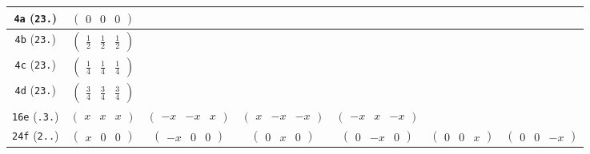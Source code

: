 \documentclass[fleqn,9pt,landscape]{jsarticle}
\begin{document}
\begin{center}
\begin{longtable}{ccccccc}
{\tt 4a} ({\tt 23.}) & $ \begin{pmatrix} 0 & 0 & 0 \end{pmatrix} $ & $  $ & $  $ & $  $ & $  $ & $  $ \\ \hline
{\tt 4b} ({\tt 23.}) & $ \begin{pmatrix} \frac{1}{2} & \frac{1}{2} & \frac{1}{2} \end{pmatrix} $ & $  $ & $  $ & $  $ & $  $ & $  $ \\ \hline
{\tt 4c} ({\tt 23.}) & $ \begin{pmatrix} \frac{1}{4} & \frac{1}{4} & \frac{1}{4} \end{pmatrix} $ & $  $ & $  $ & $  $ & $  $ & $  $ \\ \hline
{\tt 4d} ({\tt 23.}) & $ \begin{pmatrix} \frac{3}{4} & \frac{3}{4} & \frac{3}{4} \end{pmatrix} $ & $  $ & $  $ & $  $ & $  $ & $  $ \\ \hline
{\tt 16e} ({\tt .3.}) & $ \begin{pmatrix} x & x & x \end{pmatrix} $ & $ \begin{pmatrix} - x & - x & x \end{pmatrix} $ & $ \begin{pmatrix} x & - x & - x \end{pmatrix} $ & $ \begin{pmatrix} - x & x & - x \end{pmatrix} $ & $  $ & $  $ \\ \hline
{\tt 24f} ({\tt 2..}) & $ \begin{pmatrix} x & 0 & 0 \end{pmatrix} $ & $ \begin{pmatrix} - x & 0 & 0 \end{pmatrix} $ & $ \begin{pmatrix} 0 & x & 0 \end{pmatrix} $ & $ \begin{pmatrix} 0 & - x & 0 \end{pmatrix} $ & $ \begin{pmatrix} 0 & 0 & x \end{pmatrix} $ & $ \begin{pmatrix} 0 & 0 & - x \end{pmatrix} $ \\ \hline

\end{longtable}
\end{center}
\end{document}
